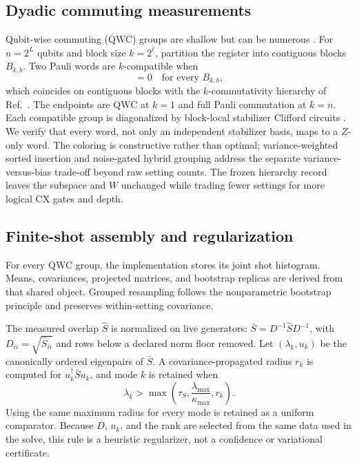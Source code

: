 \documentclass[aps,pra,reprint,superscriptaddress,nofootinbib,floatfix]{revtex4-2}
\begin{document}
\subsection{Dyadic commuting measurements}
\label{sec:dyadic}

Qubit-wise commuting (QWC) groups are shallow but can be numerous
\cite{verteletskyi2020grouping}.  For \(n=2^L\) qubits and block size
\(k=2^\ell\), partition the register into contiguous blocks \(B_{k,b}\).
Two Pauli words are \(k\)-compatible when
\begin{equation}
 [P|_{B_{k,b}},Q|_{B_{k,b}}]=0
 \quad\text{for every }B_{k,b},
 \label{eq:block-commuting}
\end{equation}
which coincides on contiguous blocks with the \(k\)-commutativity hierarchy of
Ref.~\cite{dalfavero2025kcommutativity}.
The endpoints are QWC at \(k=1\) and full Pauli commutation at \(k=n\).
Each compatible group is diagonalized by block-local stabilizer Clifford
circuits \cite{crawford2021efficient,miller2024hardware}.  We verify that every
word, not only an independent stabilizer basis, maps to a \(Z\)-only word.
The coloring is constructive rather than optimal; variance-weighted sorted
insertion \cite{crawford2021efficient,dalfavero2025kcommutativity} and
noise-gated hybrid grouping \cite{burns2024galic} address the separate
variance-versus-bias trade-off beyond raw setting counts.  The frozen hierarchy
record leaves the subspace and \(W\) unchanged while trading fewer settings for
more logical CX gates and depth.

\subsection{Finite-shot assembly and regularization}
\label{sec:finite-shot-method}

For every QWC group, the implementation stores its joint shot histogram.
Means, covariances, projected matrices, and bootstrap replicas are derived
from that shared object.  Grouped resampling follows the nonparametric
bootstrap principle \cite{efron1979bootstrap} and preserves within-setting
covariance.

The measured overlap \(\hat S\) is normalized on live generators:
\(\bar S=D^{-1}\hat S D^{-1}\), with
\(D_{ii}=\sqrt{\hat S_{ii}}\) and rows below a declared norm floor removed.
Let \((\lambda_k,u_k)\) be the canonically ordered eigenpairs of \(\bar S\).
A covariance-propagated radius \(r_k\) is computed for
\(u_k^\dagger\bar S u_k\), and mode \(k\) is retained when
\begin{equation}
 \lambda_k >
 \max\!\left(\tau_S,\frac{\lambda_{\max}}{\kappa_{\max}},r_k\right).
 \label{eq:mode-cutoff}
\end{equation}
Using the same maximum radius for every mode is retained as a uniform
comparator.  Because \(D\), \(u_k\), and the rank are selected from the same
data used in the solve, this rule is a heuristic regularizer, not a confidence
or variational certificate.
\end{document}
